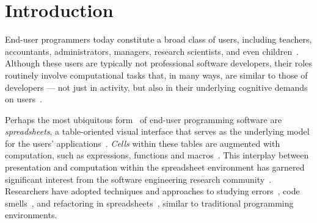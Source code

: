 \documentclass{svjour3}
\begin{document}



\section{Introduction}

End-user programmers today constitute a broad class of users, including teachers, accountants, administrators, managers, research scientists, and even children~\cite{Ko2011}.
%
Although these users are typically not professional software developers, their roles routinely involve computational tasks that, in many ways, are similar to those of developers --- not just in activity, but also in their underlying cognitive demands on users~\cite{Blackwell2002}. 

Perhaps the most ubiquitous form~\cite{Scaffidi2005} of end-user programming software are \emph{spreadsheets}, a table-oriented visual interface that serves as the underlying model for the users' applications~\cite{Nardi1990}. \emph{Cells} within these tables are augmented with computation, such as expressions, functions and macros~\cite{Nardi1990}. 
This interplay between presentation and computation within the spreadsheet environment has garnered significant interest from the software engineering research community~\cite{Burnett2009}. 
Researchers have adopted techniques and approaches to studying errors~\cite{Powell2008}, code smells~\cite{Pinzger2012}, and refactoring in spreadsheets~\cite{Badame2012}, similar to traditional programming environments. 
\end{document}
